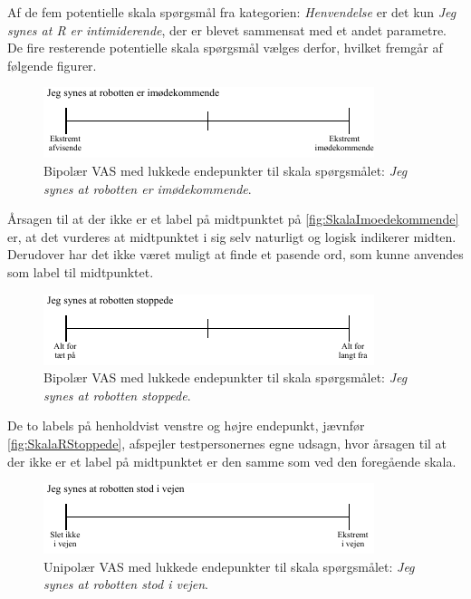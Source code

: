 Af de fem potentielle skala spørgsmål fra kategorien: \textit{Henvendelse} er det kun \textit{Jeg synes at R er intimiderende}, der er blevet sammensat med et andet parametre. De fire resterende potentielle skala spørgsmål vælges derfor, hvilket fremgår af følgende figurer.    
%
\begin{figure}[H]
\centering
\includegraphics[width =\textwidth]{Figure/UdvalgteSkalaer/Imoedekommende} 
\caption{Bipolær VAS med lukkede endepunkter til skala spørgsmålet: \textit{Jeg synes at robotten er imødekommende}.}
\label{fig:SkalaImoedekommende}
\end{figure}
\noindent
%
Årsagen til at der ikke er et label på midtpunktet på \autoref{fig:SkalaImoedekommende} er, at det vurderes at midtpunktet i sig selv naturligt og logisk indikerer midten. Derudover har det ikke været muligt at finde et pasende ord, som kunne anvendes som label til midtpunktet.  
%
\begin{figure}[H]
\centering
\includegraphics[width =\textwidth]{Figure/UdvalgteSkalaer/RStoppede} 
\caption{Bipolær VAS med lukkede endepunkter til skala spørgsmålet: \textit{Jeg synes at robotten stoppede}.}
\label{fig:SkalaRStoppede}
\end{figure}
\noindent
%
De to labels på henholdvist venstre og højre endepunkt, jævnfør \autoref{fig:SkalaRStoppede}, afspejler testpersonernes egne udsagn, hvor årsagen til at der ikke er et label på midtpunktet er den samme som ved den foregående skala. 
%
\begin{figure}[H]
\centering
\includegraphics[width =\textwidth]{Figure/UdvalgteSkalaer/RobottenErIVejen} 
\caption{Unipolær VAS med lukkede endepunkter til skala spørgsmålet: \textit{Jeg synes at robotten stod i vejen}.}
\label{fig:SkalaRerIVejen}
\end{figure}
